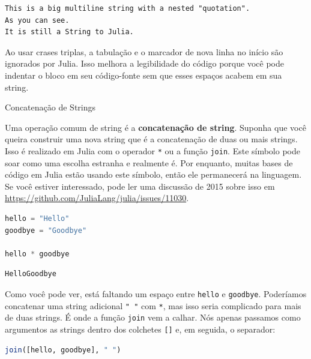\documentclass[
  notoc %
]{tufte-book}
\makeatletter
\newcommand{\passthrough}[1]{#1}
\renewcommand\subsubsection{%
\@startsection{subsubsection}{3}{\z@ }{-3.25ex\@plus -1ex \@minus -.2ex}{1.5ex \@plus .2ex}{\normalfont \normalsize \bfseries }
}
\makeatother
\begin{document}
\begin{lstlisting}[language=Output]
This is a big multiline string with a nested "quotation".
As you can see.
It is still a String to Julia.

\end{lstlisting}

Ao usar crases triplas, a tabulação e o marcador de nova linha no início
são ignorados por Julia. Isso melhora a legibilidade do código porque
você pode indentar o bloco em seu código-fonte sem que esses espaços
acabem em sua string.

\hypertarget{sec:string_concatenation}{%
\subsubsection{Concatenação de Strings}\label{sec:string_concatenation}}

Uma operação comum de string é a \textbf{concatenação de string}.
Suponha que você queira construir uma nova string que é a concatenação
de duas ou mais strings. Isso é realizado em Julia com o operador
\passthrough{\lstinline!*!} ou a função \passthrough{\lstinline!join!}.
Este símbolo pode soar como uma escolha estranha e realmente é. Por
enquanto, muitas bases de código em Julia estão usando este símbolo,
então ele permanecerá na linguagem. Se você estiver interessado, pode
ler uma discussão de 2015 sobre isso em
\url{https://github.com/JuliaLang/julia/issues/11030}.

\begin{lstlisting}[language=Julia]
hello = "Hello"
goodbye = "Goodbye"

hello * goodbye
\end{lstlisting}

\begin{lstlisting}[language=Output]
HelloGoodbye
\end{lstlisting}

Como você pode ver, está faltando um espaço entre
\passthrough{\lstinline!hello!} e \passthrough{\lstinline!goodbye!}.
Poderíamos concatenar uma string adicional \passthrough{\lstinline!" "!}
com \passthrough{\lstinline!*!}, mas isso seria complicado para mais de
duas strings. É onde a função \passthrough{\lstinline!join!} vem a
calhar. Nós apenas passamos como argumentos as strings dentro dos
colchetes \passthrough{\lstinline![]!} e, em seguida, o separador:

\begin{lstlisting}[language=Julia]
join([hello, goodbye], " ")
\end{lstlisting}
\end{document}
